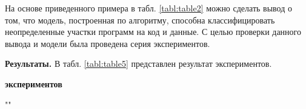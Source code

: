 \documentclass{book}
\begin{document}
На основе приведенного примера в табл. \ref{tabl:table2} можно сделать вывод о том, что модель,
построенная по алгоритму, способна классифицировать неопределенные участки программ 
на код и данные. С целью проверки данного вывода и модели была проведена серия экспериментов. 

\textbf{Результаты.} В табл. \ref{tabl:table5} представлен результат экспериментов.


\begin{table}[h!]

	\caption {\label{tabl:table5}}
	
	\centering
	\textbf{ экспериментов}

	\par{""}


\end{table}
\end{document}
